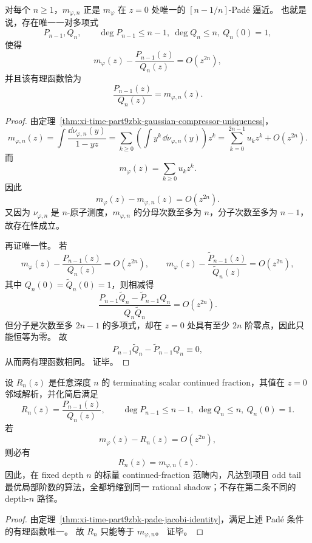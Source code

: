 \begin{theorem}\label{thm:xi-time-part9zbk-pade-jacobi-identity}
对每个 \(n\ge 1\)，\(m_{\varphi,n}\) 正是 \(m_\varphi\) 在 \(z=0\) 处唯一的 \([n-1/n]\)-Pad\'e 逼近。
也就是说，存在唯一一对多项式
\[
P_{n-1},Q_n,
\qquad
\deg P_{n-1}\le n-1,\ \deg Q_n\le n,\ Q_n(0)=1,
\]
使得
\[
m_\varphi(z)-\frac{P_{n-1}(z)}{Q_n(z)}=O(z^{2n}),
\]
并且该有理函数恰为
\[
\frac{P_{n-1}(z)}{Q_n(z)}=m_{\varphi,n}(z).
\]
\end{theorem}
\begin{proof}
由定理~\ref{thm:xi-time-part9zbk-gaussian-compressor-uniqueness}，
\[
m_{\varphi,n}(z)
=
\int\frac{\dd\nu_{\varphi,n}(y)}{1-yz}
=
\sum_{k\ge 0}\left(\int y^k\,\dd\nu_{\varphi,n}(y)\right)z^k
=
\sum_{k=0}^{2n-1}u_k z^k+O(z^{2n}).
\]
而
\[
m_\varphi(z)=\sum_{k\ge 0}u_k z^k.
\]
因此
\[
m_\varphi(z)-m_{\varphi,n}(z)=O(z^{2n}).
\]
又因为 \(\nu_{\varphi,n}\) 是 \(n\)-原子测度，\(m_{\varphi,n}\) 的分母次数至多为 \(n\)，分子次数至多为 \(n-1\)，故存在性成立。

再证唯一性。
若
\[
m_\varphi(z)-\frac{P_{n-1}(z)}{Q_n(z)}=O(z^{2n}),
\qquad
m_\varphi(z)-\frac{\widetilde P_{n-1}(z)}{\widetilde Q_n(z)}=O(z^{2n}),
\]
其中 \(Q_n(0)=\widetilde Q_n(0)=1\)，则相减得
\[
\frac{P_{n-1}\widetilde Q_n-\widetilde P_{n-1}Q_n}{Q_n\widetilde Q_n}
=
O(z^{2n}).
\]
但分子是次数至多 \(2n-1\) 的多项式，却在 \(z=0\) 处具有至少 \(2n\) 阶零点，因此只能恒等为零。
故
\[
P_{n-1}\widetilde Q_n-\widetilde P_{n-1}Q_n\equiv 0,
\]
从而两有理函数相同。
证毕。
\end{proof}

\begin{corollary}\label{cor:xi-time-part9zbk-continued-fraction-rigidity-collapse}
设 \(R_n(z)\) 是任意深度 \(n\) 的 terminating scalar continued fraction，其值在 \(z=0\) 邻域解析，并化简后满足
\[
R_n(z)=\frac{P_{n-1}(z)}{Q_n(z)},
\qquad
\deg P_{n-1}\le n-1,\ \deg Q_n\le n,\ Q_n(0)=1.
\]
若
\[
m_\varphi(z)-R_n(z)=O(z^{2n}),
\]
则必有
\[
R_n(z)=m_{\varphi,n}(z).
\]
因此，在 fixed depth \(n\) 的标量 continued-fraction 范畴内，凡达到项目 odd tail 最优局部阶数的算法，全都坍缩到同一 rational shadow；不存在第二条不同的 depth-\(n\) 路径。
\end{corollary}
\begin{proof}
由定理~\ref{thm:xi-time-part9zbk-pade-jacobi-identity}，满足上述 Pad\'e 条件的有理函数唯一。
故 \(R_n\) 只能等于 \(m_{\varphi,n}\)。
证毕。
\end{proof}

